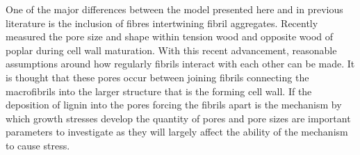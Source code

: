 One of the major differences between the model presented here and in previous
literature is the inclusion of fibres intertwining fibril aggregates. Recently \cite{Chang_2014} measured the pore size and shape within tension wood and opposite
wood of poplar during cell wall maturation. With this recent advancement,
reasonable assumptions around how regularly fibrils interact with each other can be made. It is thought that these pores
occur between joining fibrils connecting the macrofibrils into the larger
structure that is the forming cell wall. If the deposition of lignin into the
pores forcing the fibrils apart is the mechanism by which growth stresses
develop the quantity of pores and pore sizes are important parameters to
investigate as they will largely affect the ability of the mechanism to cause
stress.